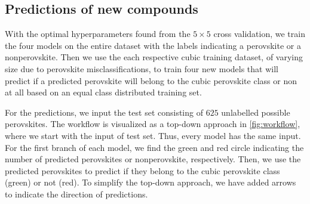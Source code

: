 \begin{table}[!ht]
\centering
\caption{Table with corresponding best estimators during a grid search scheme for predicting cubic perovskites or only perovskites. The test score is here referred to as a balanced accuracy score, and we list all standard deviations in paranthesis.}
\label{tab:cubic-optimal}
\noindent{}
\end{table}


\subsection{Predictions of new compounds}

With the optimal hyperparameters found from the $5\times5$ cross validation, we train the four models on the entire dataset with the labels indicating a perovskite or a nonperovskite. Then we use the each respective cubic training dataset, of varying size due to perovskite misclassifications, to train four new models that will predict if a predicted perovskite will belong to the cubic perovskite class or non at all based on an equal class distributed training set.



\noindent For the predictions, we input the test set consisting of $625$ unlabelled possible perovskites. The workflow is visualized as a top-down approach in \autoref{fig:workflow}, where we start with the input of test set. Thus, every model has the same input. For the first branch of each model, we find the green and red circle indicating the number of predicted perovskites or nonperovskite, respectively. Then, we use the predicted perovskites to predict if they belong to the cubic perovskite class (green) or not (red). To simplify the top-down approach, we have added arrows to indicate the direction of predictions.

